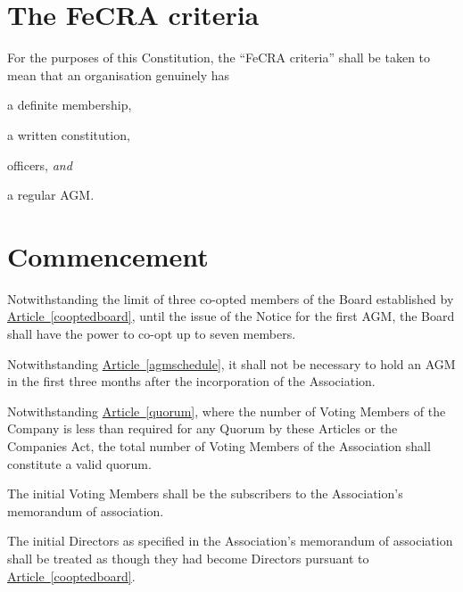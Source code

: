 \documentclass[12pt]{article}
\newcommand{\EC}[0]{Board}
\newcommand{\Exec}[0]{\EC{} }
\newcommand{\ITand}[0]{\textit{and}}
\newcommand{\articleref}[1]{\hyperref[#1]{Article~\ref*{#1}}}
\begin{document}
\newpage


\section{The FeCRA criteria}
\label{fecracrit}

For the purposes of this Constitution, the ``FeCRA criteria'' shall be taken
to mean that an organisation genuinely has

\begin{constenum}

\item a definite membership,

\item a written constitution,

\item officers, \ITand

\item a regular AGM.

\end{constenum}

\section{Commencement}

\begin{constenum}
  \item Notwithstanding the limit of three co-opted members of the
    \Exec established by \articleref{cooptedboard}, until the issue of
    the Notice for the first AGM, the \Exec shall have the power to
    co-opt up to seven members.

  \item Notwithstanding \articleref{agmschedule}, it shall not
    be necessary to hold an AGM in the first three months after the
    incorporation of the Association.

  \item Notwithstanding \articleref{quorum}, where the number of
    Voting Members of the Company is less than required for any Quorum
    by these Articles or the Companies Act, the total number of Voting
    Members of the Association shall constitute a valid quorum.

  \item The initial Voting Members shall
    be the subscribers to the Association’s memorandum of association.

  \item The initial Directors as specified in the Association’s
    memorandum of association shall be treated as though they had
    become Directors pursuant to \articleref{cooptedboard}.

\end{constenum}
\end{document}
